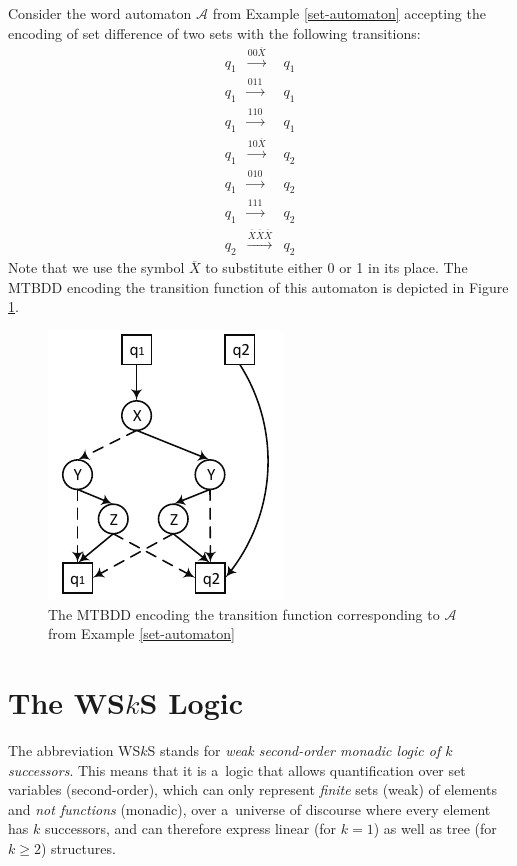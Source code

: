 \noindent\hrulefill
\begin{example}
 Consider the word automaton $\mathcal{A}$ from Example
 \ref{set-automaton} accepting the encoding of set difference of two sets with
 the following transitions:
 \begin{eqnarray*}
  q_1 & \overset{00\overline{X}}{\longrightarrow} & q_1\\
  q_1 & \overset{011}{\longrightarrow} & q_1\\
  q_1 & \overset{110}{\longrightarrow} & q_1\\
  q_1 & \overset{10\overline{X}}{\longrightarrow} & q_2\\
  q_1 & \overset{010}{\longrightarrow} & q_2\\
  q_1 & \overset{111}{\longrightarrow} & q_2\\
  q_2 & \overset{\overline{X}\overline{X}\overline{X}}{\longrightarrow} & q_2
 \end{eqnarray*}
  Note that we use the symbol $\overline{X}$ to substitute either 0 or 1
  in its place. The MTBDD encoding the transition function of this
  automaton is depicted in Figure \ref{mtbdd}.
 
 \begin{figure}[h!]
  \begin{center}
   \includegraphics{fig/bdd-transition-function-encoding}
  \end{center}
  \caption{The MTBDD encoding the transition function corresponding to
  $\mathcal{A}$ from Example
  \ref{set-automaton}}\label{mtbdd}
 \end{figure}
 
\end{example}

\noindent\hrulefill

\chapter{The WS$k$S Logic}\label{wsks}
The abbreviation WS$k$S stands for \emph{weak second-order monadic logic of $k$
successors}. This means that it is a~logic that allows quantification over set
variables (second-order), which can only represent \emph{finite} sets (weak) of
elements and \emph{not functions} (monadic), over a~universe of discourse where
every element has $k$ successors, and can therefore express linear (for $k
= 1$) as well as tree (for $k \geq 2$) structures.
 

